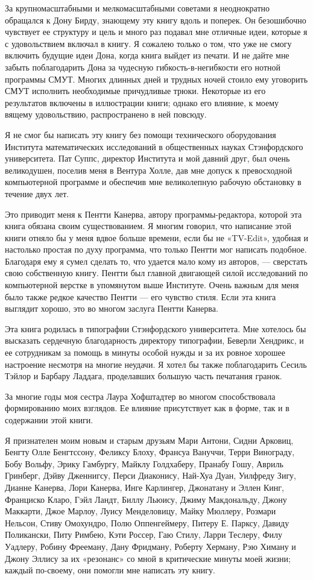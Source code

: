 За крупномасштабными и мелкомасштабными советами я неоднократно обращался к Дону Бирду, знающему эту книгу вдоль и поперек. Он безошибочно чувствует ее структуру и цель и много раз подавал мне отличные идеи, которые я с удовольствием включал в книгу. Я сожалею только о том, что уже не смогу включить будущие идеи Дона, когда книга выйдет из печати. И не дайте мне забыть поблагодарить Дона за чудесную гибкость-в-негибкости его нотной программы СМУТ. Многих длинных дней и трудных ночей стоило ему уговорить СМУТ исполнить необходимые причудливые трюки. Некоторые из его результатов включены в иллюстрации книги; однако его влияние, к моему вящему удовольствию, распространено в ней повсюду.

Я не смог бы написать эту книгу без помощи технического оборудования Института математических исследований в общественных науках Стэнфордского университета. Пат Суппс, директор Института и мой давний друг, был очень великодушен, поселив меня в Вентура Холле, дав мне допуск к превосходной компьютерной программе и обеспечив мне великолепную рабочую обстановку в течение двух лет.

Это приводит меня к Пентти Канерва, автору программы-редактора, которой эта книга обязана своим существованием. Я многим говорил, что написание этой книги отняло бы у меня вдвое больше времени, если бы не «TV-Edit», удобная и настолько простая по духу программа, что только Пентти мог написать подобное. Благодаря ему я сумел сделать то, что удается мало кому из авторов, --- сверстать свою собственную книгу. Пентти был главной двигающей силой исследований по компьютерной верстке в упомянутом выше Институте. Очень важным для меня было также редкое качество Пентти --- его чувство стиля. Если эта книга выглядит хорошо, это во многом заслуга Пентти Канерва.

Эта книга родилась в типографии Стэнфордского университета. Мне хотелось бы высказать сердечную благодарность директору типографии, Беверли Хендрикс, и ее сотрудникам за помощь в минуты особой нужды и за их ровное хорошее настроение несмотря на многие неудачи. Я хотел бы также поблагодарить Сесиль Тэйлор и Барбару Ладдага, проделавших большую часть печатания гранок.

За многие годы моя сестра Лаура Хофштадтер во многом способствовала формированию моих взглядов. Ее влияние присутствует как в форме, так и в содержании этой книги.

Я признателен моим новым и старым друзьям Мари Антони, Сидни Арковиц, Бенгту Олле Бенгтссону, Феликсу Блоху, Франсуа Вануччи, Терри Винограду, Бобу Вольфу, Эрику Гамбургу, Майклу Голдхаберу, Пранабу Гошу, Авриль Гринберг, Дэйву Дженнигсу, Перси Диаконису, Най-Хуа Дуан, Уилфреду Зигу, Дианне Канерва, Лори Канерва, Инге Карлингер, Джонатану и Эллен Кинг, Франциско Кларо, Гэйл Ландт, Биллу Льюису, Джиму Макдональду, Джону Маккарти, Джое Марлоу, Луису Менделовицу, Майку Мюллеру, Розмари Нельсон, Стиву Омохундро, Полю Оппенгеймеру, Питеру Е. Парксу, Давиду Поликански, Питу Римбею, Кэти Россер, Гаю Стилу, Ларри Теслеру, Филу Уадлеру, Робину Фрееману, Дану Фридману, Роберту Херману, Рэю Химану и Джону Эллису за их «резонанс» со мной в критические минуты моей жизни; каждый по-своему, они помогли мне написать эту книгу.

